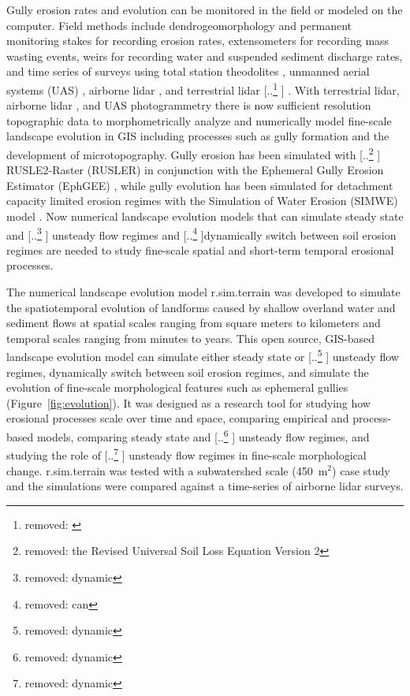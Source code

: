 \documentclass[gmd, manuscript]{copernicus}
\providecommand{\DIFadd}[1]{{\protect\color{blue} \sf #1}} %
\providecommand{\DIFdel}[1]{{\protect\color{red} [..\footnote{removed: #1} ]}} %
\providecommand{\DIFaddbegin}{} %
\providecommand{\DIFaddend}{} %
\providecommand{\DIFdelbegin}{} %
\providecommand{\DIFdelend}{} %
\begin{document}
Gully erosion rates and evolution
can be monitored in the field 
or modeled on the computer. 
Field methods include
dendrogeomorphology \citep{Malik2008} and 
permanent monitoring stakes for recording erosion rates, 
extensometers for recording mass wasting events, 
weirs for recording water and suspended sediment discharge rates, 
and time series of surveys using 
total station theodolites \citep{Thomas2004},
unmanned aerial systems (UAS) \DIFaddbegin \DIFadd{\citep{Jeziorska2016,Kasprak2019,Yang2019}}\DIFaddend ,
airborne lidar \DIFaddbegin \DIFadd{\citep{Perroy2010,Starek2011}}\DIFaddend , 
and terrestrial lidar \DIFdelbegin \DIFdel{\citep{Starek2011,Bechet2016}}\DIFdelend \DIFaddbegin \DIFadd{\citep{Starek2011,Bechet2016,Goodwin2016,Telling2017}}\DIFaddend .
With terrestrial lidar, airborne lidar\DIFaddbegin \DIFadd{, }\DIFaddend and 
UAS photogrammetry
there is now sufficient resolution topographic data 
to morphometrically analyze and 
numerically model fine-scale landscape evolution in GIS
including processes such as gully formation 
and the development of microtopography. 
Gully erosion has been simulated with 
\DIFdelbegin \DIFdel{the Revised Universal Soil Loss Equation Version 2 }\DIFdelend \DIFaddbegin \DIFadd{RUSLE2-Raster }\DIFaddend (RUSLER)
in conjunction with the Ephemeral Gully Erosion Estimator (EphGEE)
\citep{Dabney2014},
while gully evolution
has been simulated for detachment capacity limited erosion regimes
with the Simulation of Water Erosion (SIMWE) model
\citep{Koco2011, Mitasova2013}. 
Now numerical landscape evolution models 
that can simulate 
steady state and \DIFdelbegin \DIFdel{dynamic }\DIFdelend \DIFaddbegin \DIFadd{unsteady }\DIFaddend flow regimes
and \DIFdelbegin \DIFdel{can }\DIFdelend dynamically switch between soil erosion regimes 
are needed to study 
fine-scale spatial and short-term temporal erosional processes.

The numerical landscape evolution model 
r.sim.terrain was developed to 
simulate the spatiotemporal evolution of landforms
caused by shallow overland water and sediment flows
at spatial scales ranging from
square meters to kilometers
and temporal scales ranging from minutes to years. 
This open source, GIS-based landscape evolution model can
simulate either steady state or \DIFdelbegin \DIFdel{dynamic }\DIFdelend \DIFaddbegin \DIFadd{unsteady }\DIFaddend flow regimes,
dynamically switch between soil erosion regimes, and
simulate the evolution of fine-scale morphological features 
such as ephemeral gullies
(Figure~\ref{fig:evolution}).
It was designed as a research tool for
studying how erosional processes scale over time and space,
comparing empirical and process-based models, 
comparing steady state and \DIFdelbegin \DIFdel{dynamic }\DIFdelend \DIFaddbegin \DIFadd{unsteady }\DIFaddend flow regimes, and
studying the role of \DIFdelbegin \DIFdel{dynamic }\DIFdelend \DIFaddbegin \DIFadd{unsteady }\DIFaddend flow regimes
in fine-scale morphological change. 
r.sim.terrain was tested with 
a subwatershed scale (450~\unit{m}$^{2}$) case study
and the simulations were compared against 
a time-series of airborne lidar surveys.
\end{document}
